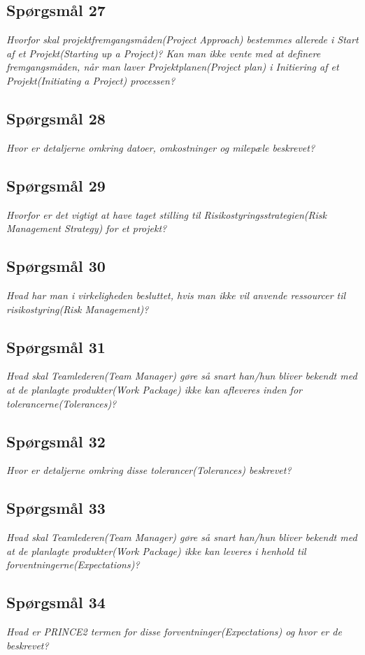 \documentclass[12pt,twoside]{article}
\begin{document}
    \subsection{Sp\o{}rgsm\r{a}l 27}
    \textit{Hvorfor skal projektfremgangsmåden(Project Approach) bestemmes allerede i Start af et Projekt(Starting up a Project)? Kan man ikke vente med at definere fremgangsmåden, når man laver Projektplanen(Project plan) i Initiering af et Projekt(Initiating a Project) processen?}
    \subsection{Sp\o{}rgsm\r{a}l 28}
    \textit{Hvor er detaljerne omkring datoer, omkostninger og milepæle beskrevet?}
    \subsection{Sp\o{}rgsm\r{a}l 29}
    \textit{Hvorfor er det vigtigt at have taget stilling til Risikostyringsstrategien(Risk Management Strategy) for et projekt?}
    \subsection{Sp\o{}rgsm\r{a}l 30}
    \textit{Hvad har man i virkeligheden besluttet, hvis man ikke vil anvende ressourcer til risikostyring(Risk Management)?}
    \subsection{Sp\o{}rgsm\r{a}l 31}
    \textit{Hvad skal Teamlederen(Team Manager) gøre så snart han/hun bliver bekendt med at de planlagte produkter(Work Package) ikke kan afleveres inden for tolerancerne(Tolerances)?}
    \subsection{Sp\o{}rgsm\r{a}l 32}
    \textit{Hvor er detaljerne omkring disse tolerancer(Tolerances) beskrevet?}
    \subsection{Sp\o{}rgsm\r{a}l 33}
    \textit{Hvad skal Teamlederen(Team Manager) gøre så snart han/hun bliver bekendt med at de planlagte produkter(Work Package) ikke kan leveres i henhold til forventningerne(Expectations)?}
    \subsection{Sp\o{}rgsm\r{a}l 34}
    \textit{Hvad er PRINCE2 termen for disse forventninger(Expectations) og hvor er de beskrevet?}
\end{document}
